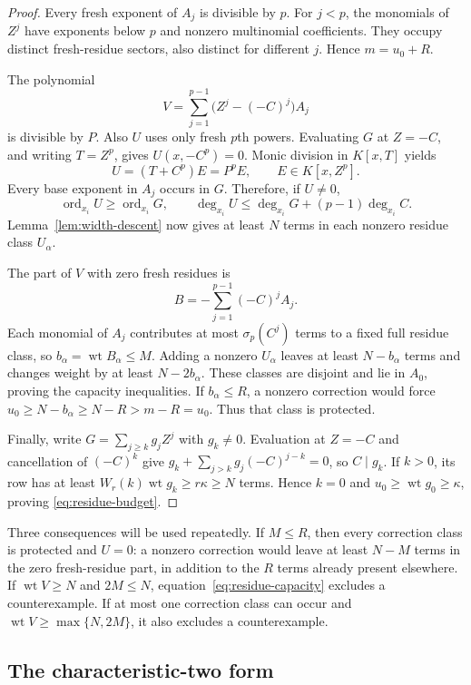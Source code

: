 \documentclass[11pt]{article}
\DeclareMathOperator{\wt}{wt}\DeclareMathOperator{\ord}{ord}
\numberwithin{equation}{section}
\theoremstyle{definition}\newtheorem{definition}[theorem]{Definition}
\theoremstyle{remark}\newtheorem{remark}[theorem]{Remark}
\begin{document}
\begin{proof}
Every fresh exponent of $A_j$ is divisible by $p$. For $j<p$,
the monomials of $Z^j$ have exponents below $p$ and nonzero
multinomial coefficients. They occupy distinct fresh-residue
sectors, also distinct for different $j$. Hence $m=u_0+R$.

The polynomial
\[
 V=\sum_{j=1}^{p-1}\bigl(Z^j-(-C)^j\bigr)A_j
\]
is divisible by $P$. Also $U$ uses only fresh $p$th powers.
Evaluating $G$ at $Z=-C$, and writing $T=Z^p$, gives
$U(x,-C^p)=0$. Monic division in $K[x,T]$ yields
\[
 U=(T+C^p)E=P^pE,\qquad E\in K[x,Z^p].
\]
Every base exponent in $A_j$ occurs in $G$. Therefore, if $U\ne0$,
\[
 \operatorname{ord}_{x_i}U\ge\operatorname{ord}_{x_i}G,
 \qquad
 \deg_{x_i}U\le\deg_{x_i}G+(p-1)\deg_{x_i}C.
\]
Lemma~\ref{lem:width-descent} now gives at least $N$ terms in each
nonzero residue class $U_\alpha$.

The part of $V$ with zero fresh residues is
\[
 B=-\sum_{j=1}^{p-1}(-C)^jA_j.
\]
Each monomial of $A_j$ contributes at most $\sigma_p(C^j)$ terms
to a fixed full residue class, so $b_\alpha=\wt B_\alpha\le M$.
Adding a nonzero $U_\alpha$ leaves at least $N-b_\alpha$ terms and
changes weight by at least $N-2b_\alpha$. These classes are
disjoint and lie in $A_0$, proving the capacity inequalities.
If $b_\alpha\le R$, a nonzero correction would force
$u_0\ge N-b_\alpha\ge N-R>m-R=u_0$. Thus that class is protected.

Finally, write $G=\sum_{j\ge k}g_jZ^j$ with $g_k\ne0$.
Evaluation at $Z=-C$ and cancellation of $(-C)^k$ give
$g_k+\sum_{j>k}g_j(-C)^{j-k}=0$, so $C\mid g_k$.
If $k>0$, its row has at
least $W_r(k)\wt g_k\ge r\kappa\ge N$ terms. Hence $k=0$ and
$u_0\ge\wt g_0\ge\kappa$, proving \eqref{eq:residue-budget}.
\end{proof}

Three consequences will be used repeatedly. If $M\le R$, then
every correction class is protected and $U=0$: a nonzero correction
would leave at least $N-M$ terms in the zero fresh-residue part,
in addition to the $R$ terms already present elsewhere.
If $\wt V\ge N$
and $2M\le N$, equation~\eqref{eq:residue-capacity} excludes a
counterexample. If at most one correction class can occur and
$\wt V\ge\max\{N,2M\}$, it also excludes a counterexample.

\subsection{The characteristic-two form}
\end{document}
